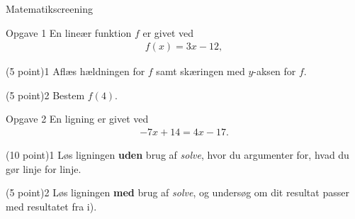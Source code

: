 \begin{center}
\LARGE
Matematikscreening 
\end{center}



\begin{opgavetekst}{Opgave 1}
	En lineær funktion $f$ er givet ved
	\begin{align*}
		f(x) = 3x-12,
	\end{align*}
\end{opgavetekst}
\begin{delopgave}{(5 point)}{1}
	Aflæs hældningen for $f$ samt skæringen med $y$-aksen for $f$. 
\end{delopgave}
\begin{delopgave}{(5 point)}{2}
	Bestem $f(4)$.
\end{delopgave}

\begin{opgavetekst}{Opgave 2}
	En ligning er givet ved
	\begin{align*}
		-7x+14 = 4x-17.
	\end{align*}
\end{opgavetekst}
\begin{delopgave}{(10 point)}{1}
	Løs ligningen \textbf{uden} brug af \textit{solve}, hvor du argumenter for, hvad du gør linje for linje.
\end{delopgave}
\begin{delopgave}{(5 point)}{2}
	Løs ligningen \textbf{med} brug af \textit{solve}, og undersøg om dit resultat passer med resultatet fra i).
\end{delopgave}



